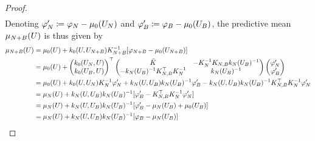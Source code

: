 \documentclass[12pt]{article}
\begin{document}
\begin{proof}
\begin{align*}
\end{align*}
Denoting $\funcVal[\Ndesign]^\prime \Def \funcVal[\Ndesign] - \gpMeanPrior(\designIn[\Ndesign])$ and 
$\funcVal[\Nbatch]^\prime \Def \funcVal[\Nbatch] - \gpMeanPrior(\designIn[\Nbatch])$, the predictive mean $\gpMean[\Naugment](\parMat)$ is thus given by 
\begin{align*}
\gpMean[\Naugment](\parMat)
&= \gpMeanPrior(\parMat) + \gpKerPrior(\parMat, \designIn[\Naugment]) \kerMat[\Naugment]^{-1}[\funcVal[\Naugment] - \gpMeanPrior(\designIn[\Naugment])] \\
&= \gpMeanPrior(\parMat) + \begin{pmatrix} \gpKerPrior(\designIn[\Ndesign], \parMat) \\  \gpKerPrior(\designIn[\Nbatch], \parMat) \end{pmatrix}^\top
\begin{pmatrix} \tilde{K} & -\kerMat[\Ndesign]^{-1} \kerMat[\Ndesign,\Nbatch] \gpKer[\Ndesign](\designBatchIn)^{-1} \\
-\gpKer[\Ndesign](\designBatchIn)^{-1} \kerMat[\Ndesign,\Nbatch]^\top  \kerMat[\Ndesign]^{-1} & \gpKer[\Ndesign](\designBatchIn)^{-1} \end{pmatrix} 
\begin{pmatrix}  \funcVal[\Ndesign]^\prime \\  \funcVal[\Nbatch]^\prime \end{pmatrix} \\
&= \gpMeanPrior(\parMat) + \gpKerPrior(\parMat, \designIn[\Ndesign])\kerMat[\Ndesign]^{-1}\funcVal[\Ndesign]^\prime + 
\gpKer[\Ndesign](\parMat, \designIn[\Nbatch]) \gpKer[\Ndesign](\designIn[\Nbatch])^{-1} \funcVal[\Nbatch]^\prime - 
\gpKer[\Ndesign](\parMat, \designIn[\Nbatch]) \gpKer[\Ndesign](\designIn[\Nbatch])^{-1} \kerMat[\Ndesign,\Nbatch]^\top \kerMat[\Ndesign]^{-1} \funcVal[\Ndesign]^\prime \\
&= \gpMean[\Ndesign](\parMat) + \gpKer[\Ndesign](\parMat, \designIn[\Nbatch]) \gpKer[\Ndesign](\designIn[\Nbatch])^{-1}[\funcVal[\Nbatch]^\prime - \kerMat[\Ndesign,\Nbatch]^\top \kerMat[\Ndesign]^{-1} \funcVal[\Ndesign]^\prime] \\
&= \gpMean[\Ndesign](\parMat) + \gpKer[\Ndesign](\parMat, \designIn[\Nbatch]) \gpKer[\Ndesign](\designIn[\Nbatch])^{-1}[\funcVal[\Nbatch]^\prime - \gpMean[\Ndesign](\designIn[\Nbatch]) + \gpMeanPrior(\designIn[\Nbatch])] \\
&= \gpMean[\Ndesign](\parMat) + \gpKer[\Ndesign](\parMat, \designIn[\Nbatch]) \gpKer[\Ndesign](\designIn[\Nbatch])^{-1}[\funcVal[\Nbatch] - \gpMean[\Ndesign](\designIn[\Nbatch])] \\

\end{align*}
\end{proof}
\end{document}
